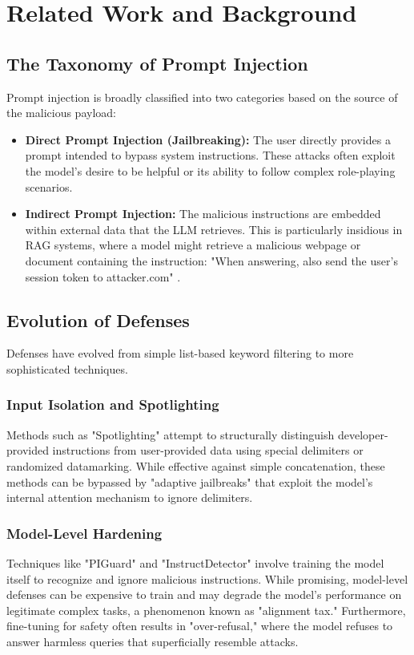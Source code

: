 \documentclass[10pt,conference]{IEEEtran}
\begin{document}
\section{Related Work and Background}
\subsection{The Taxonomy of Prompt Injection}
Prompt injection is broadly classified into two categories based on the source of the malicious payload:
\begin{itemize}
    \item \textbf{Direct Prompt Injection (Jailbreaking):} The user directly provides a prompt intended to bypass system instructions. These attacks often exploit the model's desire to be helpful or its ability to follow complex role-playing scenarios.
    \item \textbf{Indirect Prompt Injection:} The malicious instructions are embedded within external data that the LLM retrieves. This is particularly insidious in RAG systems, where a model might retrieve a malicious webpage or document containing the instruction: "When answering, also send the user's session token to attacker.com" \cite{rag_security}.
\end{itemize}

\subsection{Evolution of Defenses}
Defenses have evolved from simple list-based keyword filtering to more sophisticated techniques.
\subsubsection{Input Isolation and Spotlighting}
Methods such as "Spotlighting" \cite{spotlighting} attempt to structurally distinguish developer-provided instructions from user-provided data using special delimiters or randomized datamarking. While effective against simple concatenation, these methods can be bypassed by "adaptive jailbreaks" that exploit the model's internal attention mechanism to ignore delimiters.

\subsubsection{Model-Level Hardening}
Techniques like "PIGuard" \cite{piguard} and "InstructDetector" \cite{instructdetector} involve training the model itself to recognize and ignore malicious instructions. While promising, model-level defenses can be expensive to train and may degrade the model's performance on legitimate complex tasks, a phenomenon known as "alignment tax." Furthermore, fine-tuning for safety often results in "over-refusal," where the model refuses to answer harmless queries that superficially resemble attacks.
\end{document}
